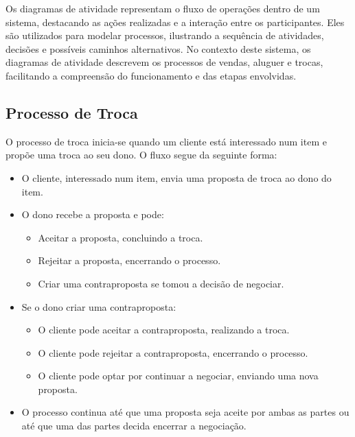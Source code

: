 \documentclass[a4paper, 12pt]{article} %
\begin{document}
Os diagramas de atividade representam o fluxo de operações dentro de um sistema, destacando as ações realizadas e a interação entre os participantes. Eles são utilizados para modelar processos, ilustrando a sequência de atividades, decisões e possíveis caminhos alternativos. No contexto deste sistema, os diagramas de atividade descrevem os processos de vendas, aluguer e trocas, facilitando a compreensão do funcionamento e das etapas envolvidas.

\subsection{Processo de Troca}
O processo de troca inicia-se quando um cliente está interessado num item e propõe uma troca ao seu dono. O fluxo segue da seguinte forma:

\begin{itemize}
	\item O cliente, interessado num item, envia uma proposta de troca ao dono do item.
	\item O dono recebe a proposta e pode:
	\begin{itemize}
		\item Aceitar a proposta, concluindo a troca.
		\item Rejeitar a proposta, encerrando o processo.
		\item Criar uma contraproposta se tomou a decisão de negociar.
	\end{itemize}
	\item Se o dono criar uma contraproposta:
	\begin{itemize}
		\item O cliente pode aceitar a contraproposta, realizando a troca.
		\item O cliente pode rejeitar a contraproposta, encerrando o processo.
		\item O cliente pode optar por continuar a negociar, enviando uma nova proposta.
	\end{itemize}
	\item O processo continua até que uma proposta seja aceite por ambas as partes ou até que uma das partes decida encerrar a negociação.
\end{itemize}
\end{document}
